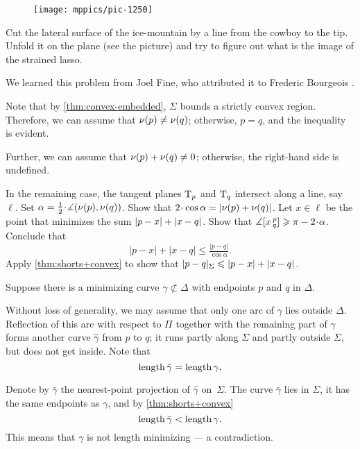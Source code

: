 \begin{multicols}{2}

\setcounter{eqtn}{0}

\begin{wrapfigure}{r}{24 mm}
\vskip-6mm
\centering
\texttt{[image: mppics/pic-1250]}
\vskip-0mm
\end{wrapfigure}

Cut the lateral surface of the ice-mountain by a line from the cowboy to the tip.
Unfold it on the plane (see the picture) and try to figure out what is the image of the strained lasso.

We learned this problem from Joel Fine, who attributed it to Frederic Bourgeois \cite{fine}.

Note that by \ref{thm:convex-embedded}, $\Sigma$ bounds a strictly convex region.
Therefore, we can assume that $\nu(p)\ne\nu(q)$; otherwise, $p=q$, and the inequality is evident.

Further, we can assume that $\Norm(p)+\Norm(q)\z\ne 0$; otherwise, the right-hand side is undefined.

In the remaining case, the tangent planes $\mathrm{T}_p$ and $\mathrm{T}_q$ intersect along a line, say $\ell$.
Set $\alpha=\tfrac12\cdot\measuredangle(\Norm(p),\Norm(q))$.
Show that $2\cdot\cos\alpha\z= |\Norm(p)+\Norm(q)|$.
Let $x\in \ell$ be the point that minimizes the sum $|p-x|\z+|x-q|$.
Show that $\measuredangle\hinge xpq\ge \pi-2\cdot\alpha$.
Conclude that 
\[|p-x|+|x-q|\le \tfrac{|p-q|}{\cos\alpha}.\]
Apply \ref{thm:shorts+convex} to show that
$\dist{p}{q}\Sigma\le |p-x|+|x-q|$.


Suppose there is a minimizing curve $\gamma\not\subset\Delta$ with endpoints $p$ and $q$ in $\Delta$.

Without loss of generality, we may assume that only one arc of $\gamma$ lies outside $\Delta$.
Reflection of this arc with respect to $\Pi$ together with the remaining part of $\gamma$ forms another curve $\hat\gamma$ from $p$ to $q$;
it runs partly along $\Sigma$ 
and partly outside $\Sigma$,
but does not get inside.
Note that
\[\mathop{\rm length}\nolimits\hat\gamma=\mathop{\rm length}\nolimits\gamma.\]


Denote by $\bar\gamma$ the nearest-point projection of $\hat\gamma$ on~$\Sigma$.
The curve $\bar\gamma$ lies in $\Sigma$, 
it has the same endpoints as $\gamma$,
and by \ref{thm:shorts+convex}
\[\mathop{\rm length}\nolimits\bar\gamma<\mathop{\rm length}\nolimits\gamma.\]
This means that $\gamma$ is not length minimizing --- 
a contradiction.


\end{multicols}
